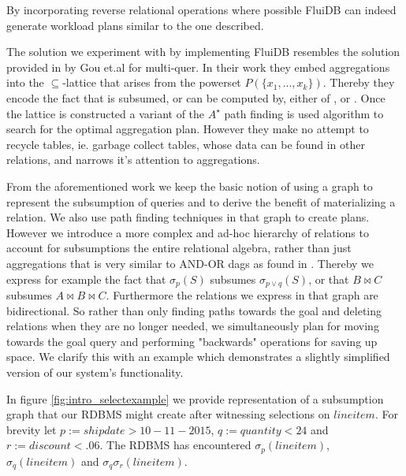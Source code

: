 By incorporating reverse relational operations where possible FluiDB
can indeed generate workload plans similar to the one described.

The solution we experiment with by implementing FluiDB resembles the
solution provided in \cite{gouSupSearchEfficient2006} by Gou et.al for
multi-quer. In their work they embed aggregations  into the \(\subseteq\)-lattice that arises from the powerset
\(P(\{x_1, ..., x_k\})\). Thereby they encode the fact that  is subsumed, or can be computed by, either of ,  or . Once the
lattice is constructed a variant of the \(A^{\star}\) path finding is
used algorithm to search for the optimal aggregation plan. However
they make no attempt to recycle tables, ie. garbage collect tables,
whose data can be found in other relations, and narrows it's attention
to aggregations.

From the aforementioned work we keep the basic notion of using a graph
to represent the subsumption of queries and to derive the benefit of
materializing a relation. We also use path finding techniques in that
graph to create plans. However we introduce a more complex and ad-hoc
hierarchy of relations to account for subsumptions the entire
relational algebra, rather than just aggregations that is very similar
to AND-OR dags as found in
\cite{mistryMaterializedViewSelection2001}. Thereby we express for
example the fact that \(\sigma_p(S)\) subsumes \(\sigma_{p \lor q}(S)\),
or that \(B \Join C\) subsumes \(A \Join B \Join C\). Furthermore the
relations we express in that graph are bidirectional. So rather than
only finding paths towards the goal and deleting relations when they
are no longer needed, we simultaneously plan for moving towards the
goal query and performing "backwards" operations for saving up
space. We clarify this with an example which demonstrates a slightly
simplified version of our system's functionality.

In figure \ref{fig:intro_selectexample} we provide representation of a
subsumption graph that our RDBMS might create after witnessing
selections on \(lineitem\). For brevity let
\(p:=shipdate > 10-11-2015\), \(q:=quantity < 24\) and
\(r:=discount < .06\). The RDBMS has encountered
\(\sigma_{p}(lineitem)\), \(\sigma_{q}(lineitem)\) and
\(\sigma_{q} \sigma_{r} (lineitem)\).


